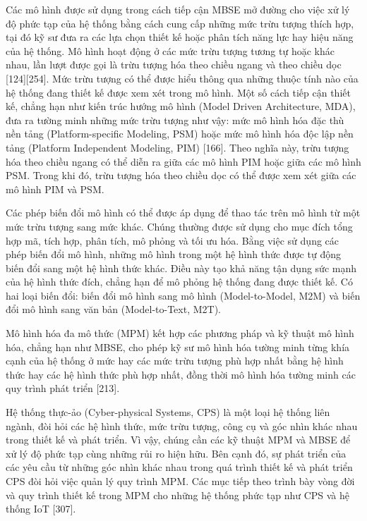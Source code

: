 Các mô hình được sử dụng trong cách tiếp cận MBSE mở đường cho việc xử lý độ phức tạp của hệ thống bằng cách cung cấp những mức trừu tượng thích hợp, tại đó kỹ sư đưa ra các lựa chọn thiết kế hoặc phân tích năng lực hay hiệu năng của hệ thống. Mô hình hoạt động ở các mức trừu tượng tương tự hoặc khác nhau, lần lượt được gọi là trừu tượng hóa theo chiều ngang và theo chiều dọc [124][254]. Mức trừu tượng có thể được hiểu thông qua những thuộc tính nào của hệ thống đang thiết kế được xem xét trong mô hình. Một số cách tiếp cận thiết kế, chẳng hạn như kiến trúc hướng mô hình (Model Driven Architecture, MDA), đưa ra tường minh những mức trừu tượng như vậy: mức mô hình hóa đặc thù nền tảng (Platform-specific Modeling, PSM) hoặc mức mô hình hóa độc lập nền tảng (Platform Independent Modeling, PIM) [166]. Theo nghĩa này, trừu tượng hóa theo chiều ngang có thể diễn ra giữa các mô hình PIM hoặc giữa các mô hình PSM. Trong khi đó, trừu tượng hóa theo chiều dọc có thể được xem xét giữa các mô hình PIM và PSM.

Các phép biến đổi mô hình có thể được áp dụng để thao tác trên mô hình từ một mức trừu tượng sang mức khác. Chúng thường được sử dụng cho mục đích tổng hợp mã, tích hợp, phân tích, mô phỏng và tối ưu hóa. Bằng việc sử dụng các phép biến đổi mô hình, những mô hình trong một hệ hình thức được tự động biến đổi sang một hệ hình thức khác. Điều này tạo khả năng tận dụng sức mạnh của hệ hình thức đích, chẳng hạn để mô phỏng hệ thống đang được thiết kế. Có hai loại biến đổi: biến đổi mô hình sang mô hình (Model-to-Model, M2M) và biến đổi mô hình sang văn bản (Model-to-Text, M2T).

Mô hình hóa đa mô thức (MPM) kết hợp các phương pháp và kỹ thuật mô hình hóa, chẳng hạn như MBSE, cho phép kỹ sư mô hình hóa tường minh từng khía cạnh của hệ thống ở mức hay các mức trừu tượng phù hợp nhất bằng hệ hình thức hay các hệ hình thức phù hợp nhất, đồng thời mô hình hóa tường minh các quy trình phát triển [213].

Hệ thống thực-ảo (Cyber-physical Systems, CPS) là một loại hệ thống liên ngành, đòi hỏi các hệ hình thức, mức trừu tượng, công cụ và góc nhìn khác nhau trong thiết kế và phát triển. Vì vậy, chúng cần các kỹ thuật MPM và MBSE để xử lý độ phức tạp cùng những rủi ro hiện hữu. Bên cạnh đó, sự phát triển của các yêu cầu từ những góc nhìn khác nhau trong quá trình thiết kế và phát triển CPS đòi hỏi việc quản lý quy trình MPM. Các mục tiếp theo trình bày vòng đời và quy trình thiết kế trong MPM cho những hệ thống phức tạp như CPS và hệ thống IoT [307].

